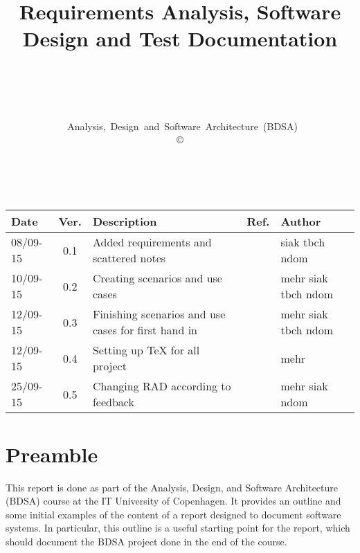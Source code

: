 \documentclass[10pt,a4paper,titlepage]{report}
\begin{document}
\thispagestyle{empty}
\title{{\LARGE\bf Requirements Analysis, Software Design and Test Documentation}}
\author{ \authors \\
\vspace*{1.0in} 
\mbox{} \\
{\Large \systemname \systemversion} \\
\vspace*{1.0in} 
\mbox{} \\
\vspace*{1.0in} 
\mbox{{ Analysis, Design and Software Architecture (BDSA)}} \\
{\large {\copyright} \companyname}
\date{\documentdate}
}

\maketitle


 \\
 \begin{tabular}{| l | c | p{5.5cm} | p{1cm}| p{1.5cm} |}
\hline
{\bf Date} & {\bf Ver.} & {\bf Description} & {\bf Ref.}& {\bf Author}\\
\hline
\hline
08/09-15 & 0.1 & Added requirements and scattered notes & & siak tbch ndom \\
\hline
10/09-15 & 0.2 & Creating scenarios and use cases & & mehr siak tbch ndom \\
\hline
12/09-15 & 0.3 & Finishing scenarios and use cases for first hand in & & mehr siak tbch ndom \\
\hline
12/09-15 & 0.4 & Setting up TeX for all project & & mehr \\
\hline
25/09-15 & 0.5 & Changing RAD according to feedback & & mehr siak ndom \\
\hline

\end{tabular}



\chapter*{Preamble}
\label{sec:preamble}

This report is done as part of the Analysis, Design, and Software Architecture (BDSA) course at the IT University of Copenhagen. It provides an outline and some initial examples of the content of a report designed to document software systems. In particular, this outline is a useful starting point for the report, which should document the BDSA project done in the end of the course. 
\end{document}
